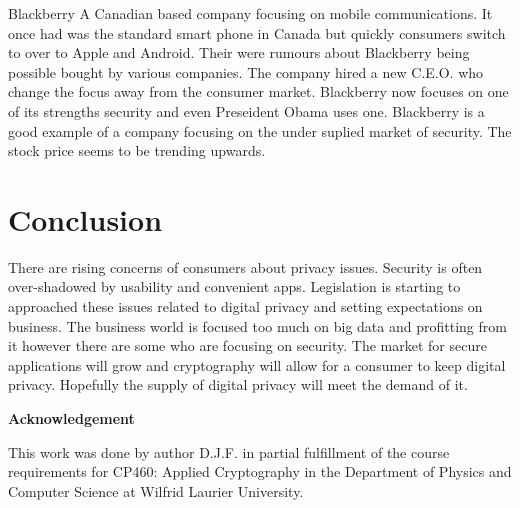 \documentclass[12pt]{article}
\begin{document}
Blackberry
A Canadian based company focusing on mobile communications. It once had was the standard smart phone in Canada but quickly consumers switch to over to Apple and Android. Their were rumours about Blackberry being possible bought by various companies. The company hired a new C.E.O. who change the focus away from the consumer market. Blackberry now focuses on one of its strengths security and even Preseident Obama uses one.\cite{Marks} Blackberry is a good example of a company focusing on the under suplied market of security. The stock price seems to be trending upwards.


\section{Conclusion}\label{sec:conclusion}
There are rising concerns of consumers about privacy issues. Security is often over-shadowed by usability and convenient apps. Legislation is starting to approached these issues related to digital privacy and setting expectations on business. The business world is focused too much on big data and profitting from it however there are some who are focusing on security. The market for secure applications will grow and cryptography will allow for a consumer to keep digital privacy. Hopefully the supply of digital privacy will meet the demand of it.

\begin{center}
{\bf Acknowledgement}
\end{center}
This work was done by author D.J.F. in partial fulfillment of the course requirements for CP460: Applied Cryptography in the Department of Physics and Computer Science at Wilfrid Laurier University.
\end{document}
